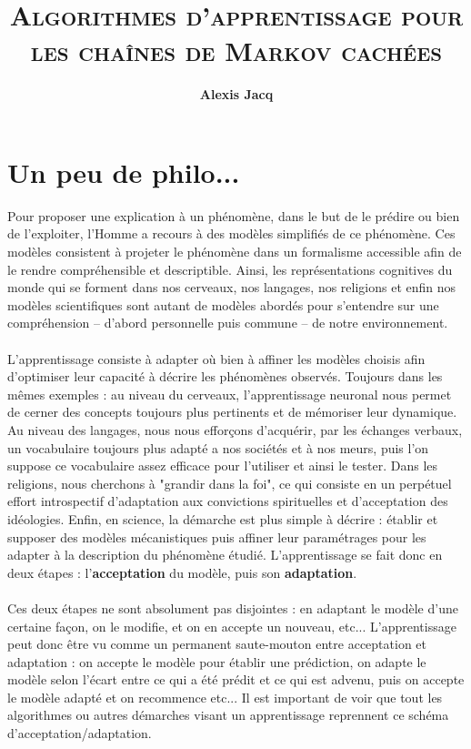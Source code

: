 \documentclass[english]{article}
\title{\textbf{\textsc{Algorithmes d'apprentissage pour les chaînes de Markov cachées}}\vspace{4mm}}
\author{\textbf{Alexis Jacq}\vspace{4mm}}
\begin{document}
\maketitle

\section{Un peu de philo...}
Pour proposer une explication à un phénomène, dans le but de le prédire ou bien de l'exploiter, l'Homme a recours à des modèles simplifiés de ce phénomène. Ces modèles consistent à projeter le phénomène dans un formalisme accessible afin de le rendre compréhensible et descriptible.  Ainsi, les représentations cognitives du monde qui se forment dans nos cerveaux, nos langages, nos religions et enfin nos modèles scientifiques sont autant de modèles abordés pour s'entendre sur une compréhension -- d'abord personnelle puis commune -- de notre environnement. \\
\\
L'apprentissage consiste à adapter où bien à affiner les modèles choisis afin d'optimiser leur capacité à décrire les phénomènes observés. Toujours dans les mêmes exemples : au niveau du cerveaux, l'apprentissage neuronal nous permet de cerner des concepts toujours plus pertinents et de mémoriser leur dynamique. Au niveau des langages, nous nous efforçons d’acquérir, par les échanges verbaux, un vocabulaire toujours plus adapté a nos sociétés et à nos meurs, puis l'on suppose ce vocabulaire assez efficace pour l'utiliser et ainsi le tester. Dans les religions, nous cherchons à "grandir dans la foi", ce qui consiste en un perpétuel effort introspectif d'adaptation aux convictions spirituelles et d'acceptation des idéologies. Enfin, en science, la démarche est plus simple à décrire : établir et supposer des modèles mécanistiques puis affiner leur paramétrages pour les adapter à la description du phénomène étudié. L'apprentissage se fait donc en deux étapes : l'\textbf{acceptation} du modèle, puis son \textbf{adaptation}. \\
\\
Ces deux étapes ne sont absolument pas disjointes : en adaptant le modèle d'une certaine façon, on le modifie, et on en accepte un nouveau, etc... L'apprentissage peut donc \^etre vu comme un permanent saute-mouton entre acceptation et adaptation : on accepte le modèle pour établir une prédiction, on adapte le modèle selon l'écart entre ce qui a été prédit et ce qui est advenu, puis on accepte le modèle adapté et on recommence etc... Il est important de voir que tout les algorithmes ou autres démarches visant un apprentissage reprennent ce schéma d'acceptation/adaptation. 
\end{document}
